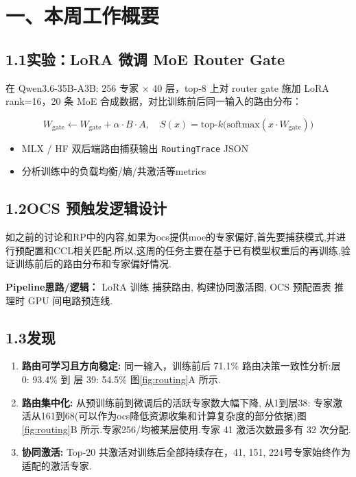 \documentclass{sjtuweekly}
\begin{document}
\makeweeklytitle

\section{一、本周工作概要}

\subsection*{1.1\quad 实验：LoRA 微调 MoE Router Gate}

在 Qwen3.6-35B-A3B: 256 专家 × 40 层，top-8 上对 router gate 施加 LoRA rank=16，20 条 MoE 合成数据，对比训练前后同一输入的路由分布：

\begin{equation}
  W_{\text{gate}} \leftarrow W_{\text{gate}} + \alpha \cdot B \cdot A,\quad
  S(x) = \text{top-}k\big(\text{softmax}(x \cdot W_{\text{gate}})\big)
  \label{eq:lora_gate}
\end{equation}

\begin{itemize}
  \item MLX / HF 双后端路由捕获输出 \texttt{RoutingTrace} JSON
  \item 分析训练中的负载均衡/熵/共激活等metrics
\end{itemize}


\subsection*{1.2\quad OCS 预触发逻辑设计}
如之前的讨论和RP中的内容,如果为ocs提供moe的专家偏好,首先要捕获模式,并进行预配置和CCL相关匹配.所以,这周的任务主要在基于已有模型权重后的再训练,验证训练前后的路由分布和专家偏好情况.

\textbf{Pipeline思路/逻辑：} LoRA 训练 捕获路由, 构建协同激活图, OCS 预配置表 推理时 GPU 间电路预连线.

\subsection*{1.3\quad 发现}

\begin{enumerate}
  \item \textbf{路由可学习且方向稳定:} 同一输入，训练前后 71.1\% 路由决策一致性分析:层 0: 93.4\% 到 层 39: 54.5\% 图\ref{fig:routing}A 所示.
  \item \textbf{路由集中化:} 从预训练前到微调后的活跃专家数大幅下降, 从1到层38: 专家激活从161到68(可以作为ocs降低资源收集和计算复杂度的部分依据)图\ref{fig:routing}B 所示.专家256/均被某层使用.专家 41 激活次数最多有 32 次分配.
  \item \textbf{协同激活:} Top-20 共激活对训练后全部持续存在，41, 151, 224号专家始终作为适配的激活专家.

\end{enumerate}
\end{document}
